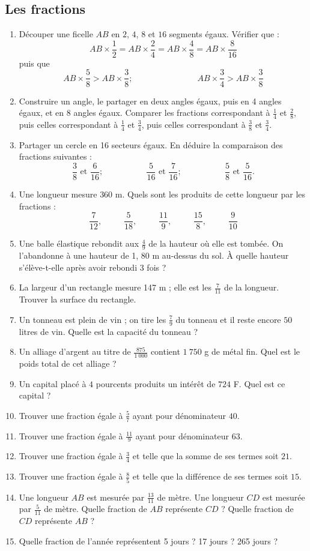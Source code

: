 \documentclass[12 pt]{extarticle}
\theoremstyle{plain}
\begin{document}
\subsection{Les fractions}
\begin{enumerate}
\item Découper une ficelle $AB$ en $2$, $4$, $8$ et $16$ segments égaux. Vérifier que : 
\[ AB \times \frac12 = AB \times \frac24 = AB \times \frac48 = AB \times \frac8{16}\]
puis que \[AB\times \frac58 > AB \times \frac38; \phantom{meowmeowmeow} AB \times \frac34 > AB \times
\frac38\]
\item Construire un angle, le partager en deux angles égaux, puis en 4 angles égaux, et en 8 angles égaux. Comparer les fractions correspondant à $\frac14$ et $\frac28$, puis celles correspondant à $\frac14$ et $\frac34$, puis celles correspondant à $\frac38$ et $\frac34$. 
\item Partager un cercle en 16 secteurs égaux. En déduire la comparaison des fractions suivantes : 
\[ \frac38\text{   et  } \frac6{16};\phantom{meowmeow}  \frac5{16}\text{   et  } \frac7{16};\phantom{meowmeow} 
 \frac58\text{   et  } \frac5{16}.\]
 \item Une longueur mesure  $360$ m. Quels sont les 
 produits de cette longueur par les fractions : 
 \[ \frac7{12}, \phantom{meow}\frac5{18},\phantom{meow}
 \frac{11}9,\phantom{meow}\frac{15}8, \phantom{meow}
 \frac9{10}\]
 \item Une balle élastique rebondit aux $\frac49$ de la hauteur où elle est tombée. On l'abandonne à une 
 hauteur de 1, 80 m au-dessus du sol. À quelle hauteur
 s'élève-t-elle après avoir rebondi 3 fois ? 
 \item La largeur d'un rectangle mesure 147 m ; elle est les $\frac7{11}$ de la longueur. Trouver la surface du rectangle. 
 \item Un tonneau est plein de vin ; on tire les $\frac79$ du tonneau et il reste encore $50$ litres de 
 vin. Quelle est la capacité du tonneau ? 
 \item Un alliage d'argent au titre de $\frac{875}{1~000}$ contient $1~750$ g de métal fin. Quel est le poids total de cet alliage ? 
 \item Un capital placé à $4$ pourcents produits un 
 intérêt de $724$ F. Quel est ce capital ? 
 \item Trouver une fraction égale à $\frac57$ ayant pour dénominateur $40$. 
 \item Trouver une fraction égale à $\frac{11}9$ 
 ayant pour dénominateur $63$. 
 \item Trouver une fraction égale à $\frac34$ 
 et telle que la somme de ses termes soit $21$.
 \item Trouver une fraction égale à $\frac85$ 
 et telle que la différence de ses termes soit $15$. 
 \item Une longueur $AB$ est mesurée par $\frac{13}{11}$ de mètre. Une longueur $CD$ est mesurée par $\frac5{11}$ de mètre. Quelle fraction de $AB$ représente $CD$ ? Quelle fraction de $CD$ représente 
$AB$ ? 
\item Quelle fraction de l'année représentent 5 jours ? 17 jours ? 265 jours ? 


\end{enumerate}
\end{document}

